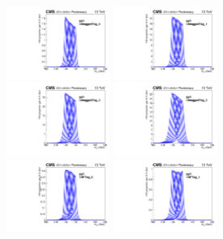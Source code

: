 \begin{figure}[ht!]
\centering
\includegraphics[width=0.3\textwidth]{modellingFigures/DCBpG/ggh_UntaggedTag_0_fmc_interp.pdf} 
\includegraphics[width=0.3\textwidth]{modellingFigures/DCBpG/ggh_UntaggedTag_1_fmc_interp.pdf} \\ 
\includegraphics[width=0.3\textwidth]{modellingFigures/DCBpG/ggh_UntaggedTag_2_fmc_interp.pdf} 
\includegraphics[width=0.3\textwidth]{modellingFigures/DCBpG/ggh_UntaggedTag_3_fmc_interp.pdf} \\
\includegraphics[width=0.3\textwidth]{modellingFigures/DCBpG/ggh_VBFTag_0_fmc_interp.pdf} 
\includegraphics[width=0.3\textwidth]{modellingFigures/DCBpG/ggh_VBFTag_1_fmc_interp.pdf} \\

\end{figure}
